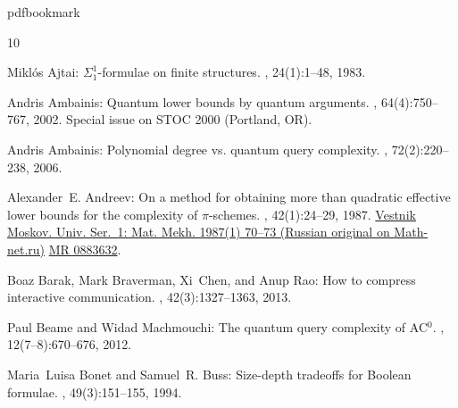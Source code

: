 \newcommand{\prelim}{Preliminary version in\ }\newcommand{\prelims}{Preliminary
  versions in\ }
\providecommand{\bibhead}[1]{}
\expandafter\ifx\csname pdfbookmark\endcsname\relax%
  \providecommand{\tocrefpdfbookmark}{}
\else\providecommand{\tocrefpdfbookmark}{%
   \hypertarget{tocreferences}{}%
   \pdfbookmark[1]{References}{tocreferences}}%
\fi

\tocrefpdfbookmark
\begin{thebibliography}{10}

\bibhead{A83}
{\sc Mikl\'{o}s Ajtai}: {$\Sigma_1^1$}-formulae on finite structures.
, 24(1):1--48, 1983.
\newblock [\epfmtdoi{10.1016/0168-0072(83)90038-6}]

\bibhead{A02}
{\sc Andris Ambainis}: Quantum lower bounds by quantum arguments.
, 64(4):750--767, 2002.
\newblock Special issue on STOC 2000 (Portland, OR).

\bibhead{A06}
{\sc Andris Ambainis}: Polynomial degree vs. quantum query complexity.
, 72(2):220--238, 2006.

\bibhead{A87}
{\sc Alexander~E. Andreev}: On a method for obtaining more than quadratic
  effective lower bounds for the complexity of $\pi$-schemes.
, 42(1):24--29, 1987.
\newblock \href{https://mi.mathnet.ru/vmumm3034}{Vestnik Moskov. Univ. Ser.~1:
  Mat. Mekh. 1987(1) 70--73 (Russian original on Math-net.ru)}
  \href{https://mathscinet.ams.org/mathscinet/article?mr=0883632}{MR 0883632}.

\bibhead{BBCR13}
{\sc Boaz Barak, Mark Braverman, Xi~Chen, and Anup Rao}: How to compress
  interactive communication.
, 42(3):1327--1363, 2013.
\newblock [\epfmtdoi{10.1137/100811969}]

\bibhead{BM12}
{\sc Paul Beame and Widad Machmouchi}: The quantum query complexity of
  {AC}\({}^{\mbox{0}}\).
, 12(7--8):670--676, 2012.

\bibhead{BB94}
{\sc Maria~Luisa Bonet and Samuel~R. Buss}: Size-depth tradeoffs for {B}oolean
  formulae.
, 49(3):151--155, 1994.
\newblock [\epfmtdoi{10.1016/0020-0190(94)90093-0}]


\end{thebibliography}
